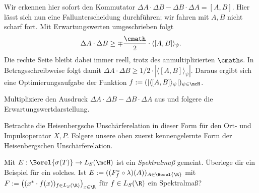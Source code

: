 \documentclass{subfiles}
\begin{document}
        Wir erkennen hier sofort den Kommutator $\Delta A\cdot\Delta B-\Delta B\cdot\Delta A = [A,B]$. Hier lässt sich nun eine Fallunterscheidung durchführen; wir fahren mit $A,B$ nicht scharf fort. Mit Erwartungswerten umgeschrieben folgt
        \[\Delta A\cdot\Delta B\geq \mp\frac{\cmath}{2}\cdot\langle[A,B]\rangle_\psi.\]
        Die rechte Seite bleibt dabei immer reell, trotz des anmultiplizierten $\cmath$s. In Betragsschreibweise folgt damit $\Delta A\cdot\Delta B\geq 1/2\cdot|\langle[A,B]\rangle_\psi|$. Daraus ergibt sich eine Optimierungsaufgabe der Funktion $f:=(|\langle[A,B]\rangle_\psi|)_{\psi\in\mcH}$. 

        \begin{Aufgabe}
            \nr{} Multipliziere den Ausdruck $\Delta A\cdot\Delta B-\Delta B\cdot\Delta A$ aus und folgere die Erwartungswertdarstellung.
            
            \nr{} Betrachte die Heisenbergsche Unschärferelation in dieser Form für den Ort- und Impulsoperator $X,P$. Folgere unsere oben zuerst kennengelernte Form der Heisenbergschen Unschärferelation.

            \nr{} Mit $E:\Borel{\sigma(T)}\to L_S(\mcH)$ ist ein \emph{Spektralmaß} gemeint. Überlege dir ein Beispiel für ein solches. Ist $E:=((F_f^*\circ\lambda)(A))_{A\in\Borel{\R}}$ mit $F:=\big((x^*\cdot f(x))_{f\in L_S(\R)}\big)_{x\in\R}$ für $f\in L_S(\R)$ ein Spektralmaß?
        \end{Aufgabe}
        
\end{document}
